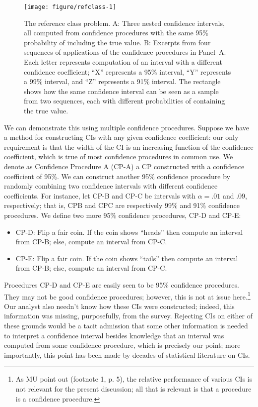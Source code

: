 \documentclass[jou,a4paper,floatsintext,draftfirst]{apa6}\usepackage[]{graphicx}\usepackage[]{color}
\makeatletter
\def\maxwidth{ %
  \ifdim\Gin@nat@width>\linewidth
    \linewidth
  \else
    \Gin@nat@width
  \fi
}
\newenvironment{knitrout}{}{} %
\makeatother
\begin{document}
\begin{knitrout}
\color{fgcolor}\begin{figure}
\texttt{[image: figure/refclass-1]} \caption[The reference class problem]{The reference class problem. A: Three nested confidence intervals, all computed from confidence procedures with the same 95\% probability of including the true value. B: Excerpts from four sequences of applications of the confidence procedures in Panel~A. Each letter represents computation of an interval with a different confidence coefficient; ``X'' represents a 95\% interval, ``Y'' represents a 99\% interval, and ``Z'' represents a 91\% interval. The rectangle shows how the same confidence interval can be seen as a sample from two sequences, each with different probabilities of containing the true value.}\label{fig:refclass}
\end{figure}


\end{knitrout}

We can demonstrate this using multiple confidence procedures. Suppose we have a method for constructing CIs with any given confidence coefficient: our only requirement is that the width of the CI is an increasing function of the confidence coefficient, which is true of most confidence procedures in common use. We denote as Confidence Procedure A (CP-A) a CP constructed with a confidence coefficient of 95\%. We can construct another 95\% confidence procedure by randomly combining two confidence intervals with different confidence coefficients. For instance, let CP-B and CP-C be intervals with $\alpha=.01$ and .09, respectively; that is, CPB and CPC are respectively 99\% and 91\% confidence procedures. We define two more 95\% confidence procedures, CP-D and CP-E:
	\begin{itemize}
	\item CP-D: Flip a fair coin. If the coin shows ``heads'' then compute an interval from CP-B; else, compute an interval from CP-C.
	\item CP-E: Flip a fair coin. If the coin shows ``tails'' then compute an interval from CP-B; else, compute an interval from CP-C.
	\end{itemize}
Procedures CP-D and CP-E are easily seen to be 95\% confidence procedures. They may not be good confidence procedures; however, this is not at issue here.\footnote{As MU point out (footnote 1, p. 5), the relative performance of various CIs is not relevant for the present discussion; all that is relevant is that a procedure is a confidence procedure.}  Our analyst also needn't know how these CIs were constructed; indeed, this information was missing, purposefully, from the survey. Rejecting CIs on either of these grounds would be a tacit admission that some other information is needed to interpret a confidence interval besides knowledge that an interval was computed from some confidence procedure, which is precisely our point; more importantly, this point has been made by decades of statistical literature on CIs. 
\end{document}
